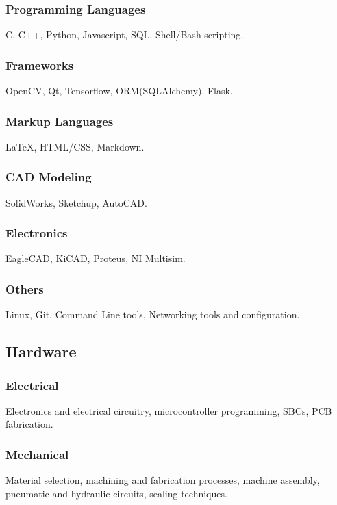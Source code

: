 \documentclass[a4paper]{article}
\begin{document}
			\subsubsection{Programming Languages}
			C, C++, Python, Javascript, SQL, Shell/Bash scripting.
			\subsubsection{Frameworks}
			OpenCV, Qt, Tensorflow, ORM(SQLAlchemy), Flask.
			\subsubsection{Markup Languages}
			{\LaTeX}, HTML/CSS, Markdown.
			\subsubsection{CAD Modeling}	
			SolidWorks, Sketchup, AutoCAD.
			\subsubsection{Electronics}	
			EagleCAD, KiCAD, Proteus, NI Multisim.
			\subsubsection{Others}
			Linux, Git, Command Line tools, Networking tools and configuration.
		\subsection{Hardware}
			\subsubsection{Electrical}
			Electronics and electrical circuitry, microcontroller programming, SBCs, PCB fabrication.
			\subsubsection{Mechanical}
			Material selection, machining and fabrication processes, machine assembly, pneumatic and hydraulic circuits, sealing techniques.

\end{document}
